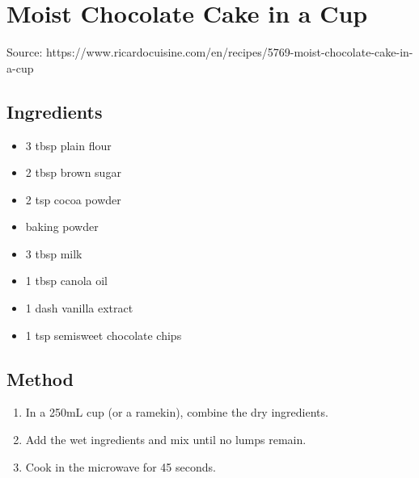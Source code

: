 \section{Moist Chocolate Cake in a Cup}


Source: https://www.ricardocuisine.com/en/recipes/5769-moist-chocolate-cake-in-a-cup

\begin{multicols}{2}
    \subsection{Ingredients}
      \begin{itemize}
        \item 3 tbsp plain flour
        \item 2 tbsp brown sugar
        \item 2 tsp cocoa powder
        \item {} baking powder
        \item 3 tbsp milk
        \item 1 tbsp canola oil
        \item 1 dash vanilla extract
        \item 1 tsp semisweet chocolate chips
      \end{itemize}
  \vfill\null
  \columnbreak
  \subsection{Method}
    \begin{enumerate}
      \item In a 250mL cup (or a ramekin), combine the dry ingredients.
      \item Add the wet ingredients and mix until no lumps remain.
      \item Cook in the microwave for 45 seconds.
    \end{enumerate}
  \end{multicols}
